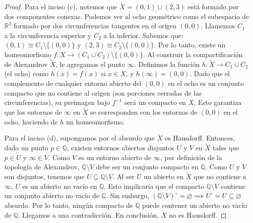 \documentclass{article}
\theoremstyle{plain}
\theoremstyle{definition}
\newcommand{\R}{\mathbb{R}}
\newcommand{\Q}{\mathbb{Q}}
\begin{document}
\begin{proof}
    Para el inciso (c), notemos que \( X = (0, 1) \cup (2, 3) \) está formado por dos componentes conexas.
    Podemos ver al ocho geométrico como el subespacio de \(\R^2\) formado por dos circunferencias tangentes en el origen \((0,0)\).
    Llamemos \(C_1\) a la circunferencia superior y \(C_2\) a la inferior. Sabemos que: \( (0,1) \cong C_1 \setminus \{(0,0)\} \) y \((2,3) \cong C_2 \setminus \{(0,0)\} \).
    Por lo tanto, existe un homeomorfismo \(f: X \to (C_1 \cup C_2) \setminus \{(0,0)\} \).
    Al construir la compactificación de Alexandrov \(\tilde{X}\), le agregamos el punto \(\infty \). Definimos la función \(h: \tilde{X} \to C_1 \cup C_2\) (el ocho) como \(h(x) = f(x)\) si \(x \in X\), y \(h(\infty) = (0,0)\).
    Dado que el complemento de cualquier entorno abierto del \((0,0)\) en el ocho es un conjunto compacto que no contiene al origen (son porciones cerradas de las circunferencias), su preimagen bajo \(f^{-1}\) será un compacto en \(X\).
    Esto garantiza que los entornos de \(\infty \) en \(\tilde{X}\) se corresponden con los entornos de \((0,0)\) en el ocho, haciendo de \(h\) un homeomorfismo.

    Para el inciso (d), supongamos por el absurdo que \( \tilde{X} \) es Hausdorff. Entonces, dado un punto \( p \in \Q \),
    existen entornos abiertos disjuntos \( U \) y \( V \) en \( \tilde{X} \) tales que \( p \in U \) y \( \infty \in V \).
    Como \( V \) es un entorno abierto de \( \infty \), por definición de la topología de Alexandrov, \( \Q \setminus V \)
    debe ser un conjunto compacto en \( \Q \).
    Como \( U \) y \( V \) son disjuntos, tenemos que \( U \subseteq \Q \setminus V \). Al ser \( U \) un abierto en \( \tilde{X} \) que no contiene a
    \( \infty \), \( U \) es un abierto no vacío en \( \Q \).
    Esto implicaría que el compacto \(\Q \setminus V\) contiene un conjunto abierto no vacío de \(\Q \). Sin embargo, \( {(\Q \setminus V)}^\circ = \varnothing \implies U^\circ = U \subseteq \varnothing \) absurdo.
    Por lo tanto, ningún compacto de \(\Q \) puede contener un abierto no vacío de \( \Q \).
    Llegamos a una contradicción. En conclusión, \( \tilde{X} \) no es Hausdorff.
\end{proof}
\end{document}
